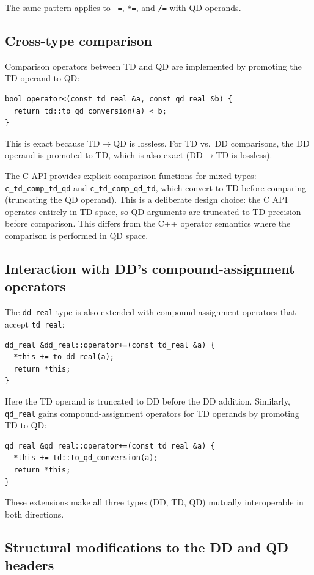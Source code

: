 \documentclass[11pt,a4paper]{article}
\begin{document}
The same pattern applies to \texttt{-=}, \texttt{*=}, and
\texttt{/=} with QD operands.

\subsection{Cross-type comparison}

Comparison operators between TD and QD are implemented by promoting
the TD operand to QD:
\begin{lstlisting}
bool operator<(const td_real &a, const qd_real &b) {
  return td::to_qd_conversion(a) < b;
}
\end{lstlisting}
This is exact because TD$\to$QD is lossless.  For TD vs.\ DD
comparisons, the DD operand is promoted to TD, which is also exact
(DD$\to$TD is lossless).

The C API provides explicit comparison functions for mixed types:
\texttt{c\_td\_comp\_td\_qd} and \texttt{c\_td\_comp\_qd\_td},
which convert to TD before comparing (truncating the QD operand).
This is a deliberate design choice: the C API operates entirely
in TD space, so QD arguments are truncated to TD precision before
comparison.  This differs from the C++ operator semantics where
the comparison is performed in QD space.

\subsection{Interaction with DD's compound-assignment operators}

The \texttt{dd\_real} type is also extended with compound-assignment
operators that accept \texttt{td\_real}:
\begin{lstlisting}
dd_real &dd_real::operator+=(const td_real &a) {
  *this += to_dd_real(a);
  return *this;
}
\end{lstlisting}
Here the TD operand is truncated to DD before the DD addition.
Similarly, \texttt{qd\_real} gains compound-assignment operators
for TD operands by promoting TD to QD:
\begin{lstlisting}
qd_real &qd_real::operator+=(const td_real &a) {
  *this += td::to_qd_conversion(a);
  return *this;
}
\end{lstlisting}
These extensions make all three types (DD, TD, QD) mutually
interoperable in both directions.

\subsection{Structural modifications to the DD and QD headers}
\end{document}
